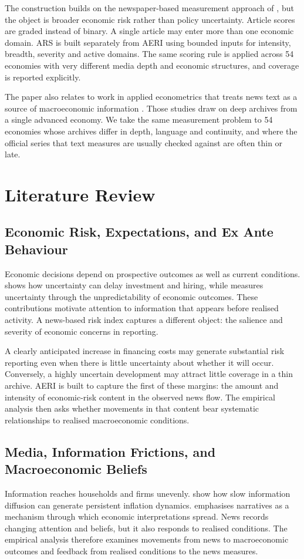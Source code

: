 \documentclass[12pt]{article}
\begin{document}
The construction builds on the newspaper-based measurement approach of \citet{baker2016}, but the object is broader economic risk rather than policy uncertainty. Article scores are graded instead of binary. A single article may enter more than one economic domain. ARS is built separately from AERI using bounded inputs for intensity, breadth, severity and active domains. The same scoring rule is applied across 54 economies with very different media depth and economic structures, and coverage is reported explicitly.

The paper also relates to work in applied econometrics that treats news text as a source of macroeconomic information \citep{thorsrud2020,ellingsen2022,kalamara2022}. Those studies draw on deep archives from a single advanced economy. We take the same measurement problem to 54 economies whose archives differ in depth, language and continuity, and where the official series that text measures are usually checked against are often thin or late.

\section{Literature Review}\label{sec:literature}
\subsection{Economic Risk, Expectations, and Ex Ante Behaviour}
Economic decisions depend on prospective outcomes as well as current conditions. \citet{bloom2009} shows how uncertainty can delay investment and hiring, while \citet{jurado2015} measures uncertainty through the unpredictability of economic outcomes. These contributions motivate attention to information that appears before realised activity. A news-based risk index captures a different object: the salience and severity of economic concerns in reporting.

A clearly anticipated increase in financing costs may generate substantial risk reporting even when there is little uncertainty about whether it will occur. Conversely, a highly uncertain development may attract little coverage in a thin archive. AERI is built to capture the first of these margins: the amount and intensity of economic-risk content in the observed news flow. The empirical analysis then asks whether movements in that content bear systematic relationships to realised macroeconomic conditions.
\subsection{Media, Information Frictions, and Macroeconomic Beliefs}
Information reaches households and firms unevenly. \citet{mankiwreis2002} show how slow information diffusion can generate persistent inflation dynamics. \citet{shiller2017} emphasises narratives as a mechanism through which economic interpretations spread. News records changing attention and beliefs, but it also responds to realised conditions. The empirical analysis therefore examines movements from news to macroeconomic outcomes and feedback from realised conditions to the news measures.
\end{document}
